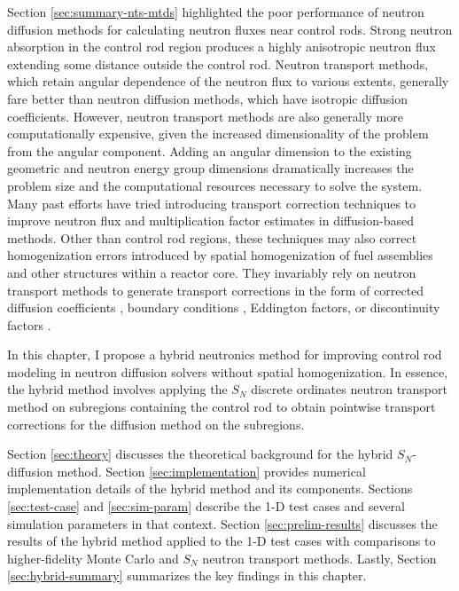 Section \ref{sec:summary-nts-mtds} highlighted the poor performance of neutron diffusion
methods for calculating neutron fluxes near control rods. Strong neutron absorption in the control
rod region produces a highly anisotropic neutron flux extending some distance outside the control
rod. Neutron transport methods, which retain angular dependence of the neutron flux to various
extents, generally fare better than neutron diffusion methods, which have isotropic diffusion
coefficients. However, neutron transport methods are also generally more computationally expensive,
given the increased dimensionality of the problem from the angular component. Adding an angular
dimension to the existing geometric and neutron energy group dimensions dramatically
increases the problem size and the computational resources necessary to solve the system. Many past
efforts have tried introducing
transport correction techniques to improve neutron flux and multiplication factor estimates in
diffusion-based methods. Other than control rod regions, these techniques may also correct
homogenization errors introduced by spatial homogenization of fuel assemblies and other
structures within a reactor core. They invariably rely on neutron transport methods to generate
transport corrections in the form of corrected diffusion coefficients
\cite{bretscher_computing_1997, scherer_determination_1976, ronen_accurate_2004,
pounders_diffusion_2009, kavenoky_sph_1978}, boundary conditions \cite{davison_influence_1951,
pellaud_extrapolation_1968, fen_modelling_1992}, Eddington factors, or discontinuity factors
\cite{koebke_new_1980}.

In this chapter, I propose a hybrid neutronics method for improving control rod modeling in neutron
diffusion solvers without spatial homogenization. In essence, the hybrid method involves applying
the $S_N$ discrete ordinates neutron transport method on subregions containing the control rod to
obtain pointwise transport corrections for the diffusion method on the subregions.

Section \ref{sec:theory} discusses the theoretical background for the hybrid $S_N$-diffusion
method. Section \ref{sec:implementation} provides numerical implementation details of
the hybrid method and its components. Sections \ref{sec:test-case} and \ref{sec:sim-param} describe
the 1-D test cases and several simulation parameters in that context. Section
\ref{sec:prelim-results} discusses the results of the hybrid method applied to the 1-D test cases
with comparisons to higher-fidelity Monte Carlo and $S_N$ neutron transport methods. Lastly,
Section \ref{sec:hybrid-summary} summarizes the key findings in this chapter.

